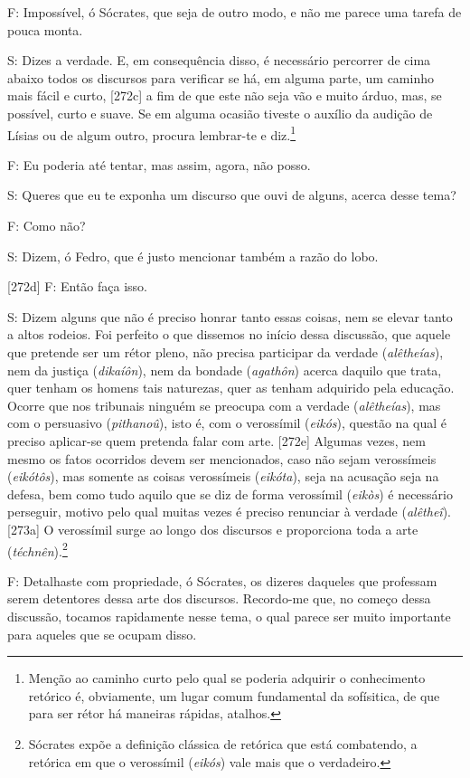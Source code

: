 F: Impossível, ó Sócrates, que seja de outro modo, e não me parece uma
tarefa de pouca monta.

S: Dizes a verdade. E, em consequência disso, é necessário percorrer de
cima abaixo todos os discursos para verificar se há, em alguma parte, um
caminho mais fácil e curto, {[}272c{]} a fim de que este não seja vão e
muito árduo, mas, se possível, curto e suave. Se em alguma ocasião
tiveste o auxílio da audição de Lísias ou de algum outro, procura
lembrar-te e diz.\footnote{Menção ao caminho curto pelo qual se poderia
  adquirir o conhecimento retórico é, obviamente, um lugar comum
  fundamental da sofísitica, de que para ser rétor há maneiras rápidas,
  atalhos.}

F: Eu poderia até tentar, mas assim, agora, não posso.

S: Queres que eu te exponha um discurso que ouvi de alguns, acerca desse
tema?

F: Como não?

S: Dizem, ó Fedro, que é justo mencionar também a razão do lobo.

{[}272d{]} F: Então faça isso.

S: Dizem alguns que não é preciso honrar tanto essas coisas, nem se
elevar tanto a altos rodeios. Foi perfeito o que dissemos no início
dessa discussão, que aquele que pretende ser um rétor pleno, não precisa
participar da verdade (\emph{alêtheías}), nem da justiça
(\emph{dikaíôn}), nem da bondade (\emph{agathôn}) acerca daquilo que
trata, quer tenham os homens tais naturezas, quer as tenham adquirido
pela educação. Ocorre que nos tribunais ninguém se preocupa com a
verdade (\emph{alêtheías}), mas com o persuasivo (\emph{pithanoû}), isto
é, com o verossímil (\emph{eikós}), questão na qual é preciso aplicar-se
quem pretenda falar com arte. {[}272e{]} Algumas vezes, nem mesmo os
fatos ocorridos devem ser mencionados, caso não sejam verossímeis
(\emph{eikótôs}), mas somente as coisas verossímeis (\emph{eikóta}),
seja na acusação seja na defesa, bem como tudo aquilo que se diz de
forma verossímil (\emph{eikòs}) é necessário perseguir, motivo pelo qual
muitas vezes é preciso renunciar à verdade (\emph{alêtheî}). {[}273a{]}
O verossímil surge ao longo dos discursos e proporciona toda a arte
(\emph{téchnên}).\footnote{Sócrates expõe a definição clássica de
  retórica que está combatendo, a retórica em que o verossímil
  (\emph{eikós}) vale mais que o verdadeiro.}

F: Detalhaste com propriedade, ó Sócrates, os dizeres daqueles que
professam serem detentores dessa arte dos discursos. Recordo-me que, no
começo dessa discussão, tocamos rapidamente nesse tema, o qual parece
ser muito importante para aqueles que se ocupam disso.

